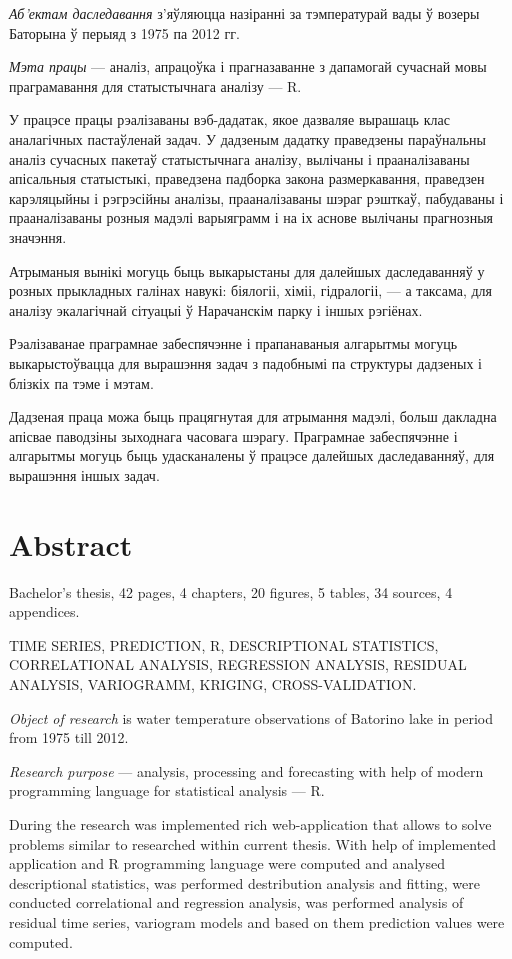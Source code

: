 \documentclass[a4paper,12pt]{report}
\begin{document}
	\textit{Аб'ектам даследавання} з'яўляюцца назіранні за тэмпературай вады ў возеры Баторына ў перыяд з 1975 па 2012 гг.

	\textit{Мэта працы} --- аналіз, апрацоўка і прагназаванне з дапамогай сучаснай мовы праграмавання для статыстычнага аналізу --- R.

	У працэсе працы рэалізаваны вэб-дадатак, якое дазваляе вырашаць клас аналагічных пастаўленай задач. У дадзеным дадатку праведзены параўнальны аналіз сучасных пакетаў статыстычнага аналізу, вылічаны і прааналізаваны апісальныя статыстыкі, праведзена падборка закона размеркавання, праведзен карэляцыйны і рэгрэсійны аналізы, прааналізаваны шэраг рэшткаў, пабудаваны і прааналізаваны розныя мадэлі варыяграмм і на іх аснове вылічаны прагнозныя значэння.

	Атрыманыя вынікі могуць быць выкарыстаны для далейшых даследаванняў у розных прыкладных галінах навукі: біялогіі, хіміі, гідралогіі, --- а таксама, для аналізу экалагічнай сітуацыі ў Нарачанскім парку і іншых рэгіёнах.

	Рэалізаванае праграмнае забеспячэнне і прапанаваныя алгарытмы могуць выкарыстоўвацца для вырашэння задач з падобнымі па структуры дадзеных і блізкіх па тэме і мэтам.

	Дадзеная праца можа быць працягнутая для атрымання мадэлі, больш дакладна апісвае паводзіны зыходнага часовага шэрагу. Праграмнае забеспячэнне і алгарытмы могуць быць удасканалены ў працэсе далейшых даследаванняў, для вырашэння іншых задач.

	\newpage

	\chapter*{Abstract}
	Bachelor's thesis, 42 pages, 4 chapters, 20 figures, 5 tables, 34 sources, 4 appendices.

	TIME SERIES, PREDICTION, R, DESCRIPTIONAL STATISTICS, CORRELATIONAL ANALYSIS, REGRESSION ANALYSIS, RESIDUAL ANALYSIS, VARIOGRAMM, KRIGING, CROSS-VALIDATION.

	\textit{Object of research} is water temperature observations of Batorino lake in period from 1975 till 2012.

	\textit{Research purpose} --- analysis, processing and forecasting with help of modern programming language for statistical analysis --- R.

	During the research was implemented rich web-application that allows to solve problems similar to researched within current thesis. With help of implemented application and R programming language were computed and analysed descriptional statistics, was performed destribution analysis and fitting, were conducted correlational and regression analysis, was performed analysis of residual time series, variogram models and based on them prediction values were computed.
\end{document}
